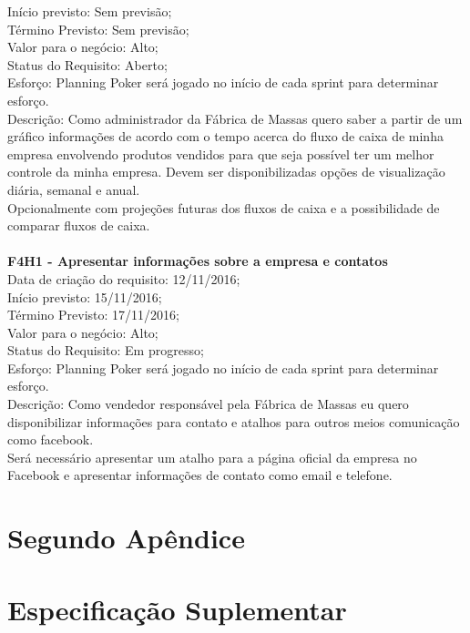 \begin{apendicesenv}
\tab Início previsto: Sem previsão;\\
\tab Término Previsto: Sem previsão;\\
\tab Valor para o negócio: Alto;\\
\tab Status do Requisito: Aberto;\\
\tab Esforço: Planning Poker será jogado no início de cada sprint para determinar esforço.\\
\tab Descrição: Como administrador da Fábrica de Massas quero saber a partir de um gráfico informações de acordo com o tempo acerca do fluxo de caixa de minha empresa envolvendo produtos vendidos para que seja possível ter um melhor controle da minha empresa. Devem ser disponibilizadas opções de visualização diária, semanal e anual.\\
\tab Opcionalmente com projeções futuras dos fluxos de caixa e a possibilidade de comparar fluxos de caixa.\\
\\
\textbf{F4H1 - Apresentar informações sobre a empresa e contatos}\\
\tab Data de criação do requisito: 12/11/2016;\\
\tab Início previsto: 15/11/2016;\\
\tab Término Previsto: 17/11/2016;\\
\tab Valor para o negócio: Alto;\\
\tab Status do Requisito: Em progresso;\\
\tab Esforço: Planning Poker será jogado no início de cada sprint para determinar esforço.\\
\tab Descrição: Como vendedor responsável pela Fábrica de Massas eu quero disponibilizar informações para contato e atalhos para outros meios comunicação como facebook.\\
\tab Será necessário apresentar um atalho para a página oficial da empresa no Facebook e apresentar informações de contato como email e telefone.\\







\chapter{Segundo Apêndice}

\chapter{Especificação Suplementar}


\end{apendicesenv}
